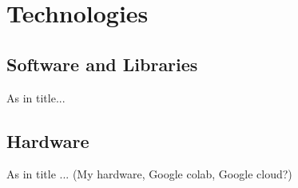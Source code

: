 \chapter{Technologies}
\section{Software and Libraries}
As in title...

\section{Hardware}
As in title ... (My hardware, Google colab, Google cloud?)